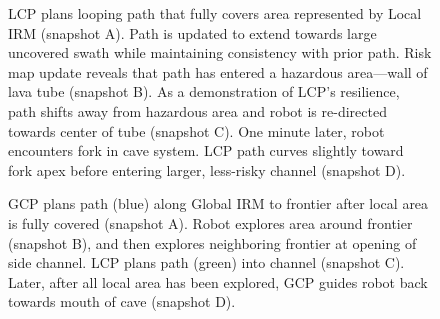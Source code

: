 \documentclass[letterpaper]{article} %
\begin{document}

\begin{figure}[h!]
\centering
\caption{LCP plans looping path that fully covers area represented by Local IRM (snapshot A). Path is updated to extend towards large uncovered swath while maintaining consistency with prior path. Risk map update reveals that path has entered a hazardous area---wall of lava tube (snapshot B). As a demonstration of LCP's resilience, path shifts away from hazardous area and robot is re-directed towards center of tube (snapshot C). One minute later, robot encounters fork in cave system. LCP path curves slightly toward fork apex before entering larger, less-risky channel (snapshot D). } \label{fig:mlp_hardware_tests} 
\end{figure}

\begin{figure}[h!]
\centering
\caption{GCP plans path (blue) along Global IRM to frontier after local area is fully covered (snapshot A). Robot explores area around frontier (snapshot B), and then explores neighboring frontier at opening of side channel. LCP plans path (green) into channel (snapshot C). Later, after all local area has been explored, GCP guides robot back towards mouth of cave (snapshot D).} \label{fig:glp_hardware_tests} 
\end{figure}
\end{document}

